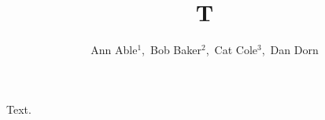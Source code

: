 \documentclass[aps,superscriptaddress]{revtex4-1}
\begin{document}
\title{T}
\author{Ann Able$^{1}$,~Bob Baker$^{2}$,~Cat Cole$^{3}$,~Dan Dorn}
\maketitle
Text.
\end{document}
